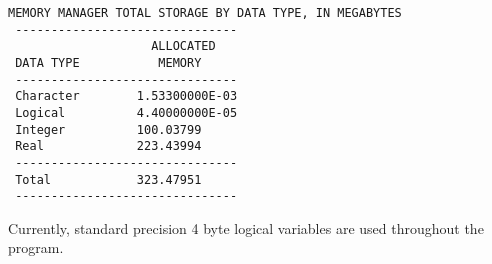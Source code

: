{\small
\begin{lstlisting}[style=modeloutput]
 MEMORY MANAGER TOTAL STORAGE BY DATA TYPE, IN MEGABYTES
 -------------------------------
                    ALLOCATED   
 DATA TYPE           MEMORY     
 -------------------------------
 Character        1.53300000E-03
 Logical          4.40000000E-05
 Integer          100.03799     
 Real             223.43994     
 -------------------------------
 Total            323.47951     
 -------------------------------
\end{lstlisting}
}

Currently, standard precision 4 byte logical variables are used throughout the program.
